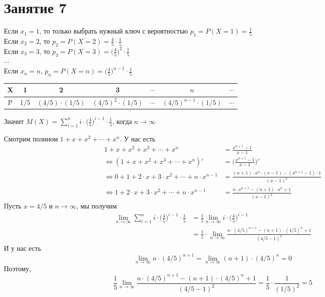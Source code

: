 \section*{Занятие 7}
\begin{exercise}[1]
	Если $x_1 = 1$, то только выбрать нужный ключ с вероятностью $p_1 = P(X=1) = \frac{1}{5}$ \\ Если $x_2 = 2$, то $p_2 = P(X=2) = \frac{4}{5} \cdot \frac{1}{5}$ \\ Если $x_3 = 3$, то $p_3 = P(X=3) = \Big(\frac{4}{5}\Big)^2 \cdot \frac{1}{5}$ \\ $\cdots$ \\ Если $x_n = n$, $p_n = P(X=n) = \Big(\frac{4}{5}\Big)^{n-1} \cdot \frac{1}{5}$
	\begin{center}
		\begin{tabular}{| c | c | c | c | c | c | c |}
			\hline
			X & 1 & 2 & 3 & $\cdots$ & $n$ & $\cdots$ \\
			\hline
			P & 1/5 & $(4/5) \cdot (1/5)$ & $(4/5)^2 \cdot (1/5)$ & $\cdots$ & $(4/5)^{n-1} \cdot (1/5)$ & $\cdots$ \\
			\hline
		\end{tabular}
	\end{center}
	Значит $M(X) = \sum_{i=1}^{n} i \cdot \Big(\frac{4}{5}\Big)^{i-1} \cdot \frac{1}{5}$, когда $n \rightarrow \infty$
	
	Смотрим полином $1 + x + x^2 + \cdots + x^n$. У нас есть
	\begin{align*}
		1 + x + x^2 + x^3 + \cdots + x^n & = \frac{x^{n+1} - 1}{x-1} \\ \Leftrightarrow (1 + x + x^2 + x^3 + \cdots + x^n)' & = \Big(\frac{x^{n+1} - 1}{x-1}\Big)' \\ \Leftrightarrow 0 + 1 + 2 \cdot x + 3 \cdot x^2 + \cdots + n \cdot x^{n-1} & = \frac{(n+1) \cdot x^n \cdot (x-1) - (x^{n+1}-1) \cdot 1}{(x-1)^2} \\ \Leftrightarrow 1 + 2 \cdot x + 3 \cdot x^2 + \cdots + n \cdot x^{n-1} & = \frac{n \cdot x^{n+1} - (n+1) \cdot x^n + 1}{(x-1)^2}
	\end{align*}
	Пусть $x=4/5$ и $n \rightarrow \infty$, мы получим
	\begin{align*}
		\lim_{n\to\infty} \sum_{i=1}^{n} i \cdot \Big(\frac{4}{5}\Big)^{i-1} \cdot \frac{1}{5} & = \frac{1}{5} \lim_{n\to\infty} i \cdot \Big(\frac{4}{5}\Big)^{i-1} \\ & = \frac{1}{5} \cdot \lim_{n\to\infty}\frac{n \cdot (4/5)^{n+1} - (n+1) \cdot (4/5)^n + 1}{(4/5-1)^2}
	\end{align*}
	И у нас есть $$\lim_{n\to\infty} n \cdot (4/5)^{n+1} = \lim_{n\to\infty} (n+1) \cdot (4/5)^n = 0$$
	Поэтому, 
	$$\frac{1}{5} \lim_{n\to\infty} \frac{n \cdot (4/5)^{n+1} - (n+1) \cdot (4/5)^n + 1}{(4/5-1)^2} = \frac{1}{5} \cdot \frac{1}{(1/5)^2} = 5$$
\end{exercise}

